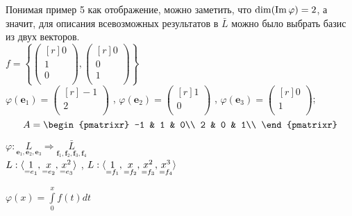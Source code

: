 Понимая пример 5 как отображение, можно заметить, что $\dim(\operatorname{\mathop{Im}}\varphi)=2$,  а значит, для описания всевозможных результатов в $\bar L$ можно было выбрать базис из двух векторов.\\
$ f= \left\{ \left(
\begin{smallmatrix*}[r]
0\\ 1\\ 0\\
\end{smallmatrix*}
\right) 
, 
\left(
\begin{smallmatrix*}[r]
0\\ 0\\ 1\\
\end{smallmatrix*}
\right) 
\right\}$\\ 
$\varphi (\textbf{e$_1$})=\left(
\begin{smallmatrix*}[r]
-1\\ 2\\
\end{smallmatrix*}
\right) $
,
$\varphi (\textbf{e$_2$})=\left(
\begin{smallmatrix*}[r]
1\\ 0\\
\end{smallmatrix*}
\right) $
,
$\varphi (\textbf{e$_3$})=\left(
\begin{smallmatrix*}[r]
0\\ 1\\
\end{smallmatrix*}
\right) $;\\
$$A=
\begin{pmatrixr}
-1 & 1 & 0\\
 2 & 0 & 1\\
\end{pmatrixr}
$$
\begin{prim}
$ \varphi : \underset{\textbf{e$_1$}, \textbf{e$_2$}, \textbf{e$_3$}}L \Rightarrow \underset{\textbf{f$_1$}, \textbf{f$_2$}, \textbf{f$_3$}, \textbf{f$_4$}}{\bar L} $\\

$L: \langle\underset{=\text{\textbf{$e_1$}}}1, \underset{=\text{\textbf{$e_2$}}}x, \underset{=\text{\textbf{$e_3$}}}{x^2}\rangle$ , 
$L: \langle\underset{=\text{\textbf{$f_1$}}}1, \underset{=\text{\textbf{$f_2$}}}x, \underset{=\text{\textbf{$f_3$}}}{x^2}, \underset{=\text{\textbf{$f_4$}}}{x^3}\rangle$ \\
\end{prim}
$\varphi (x)=\int\limits^x_0 f(t)dt$\\
